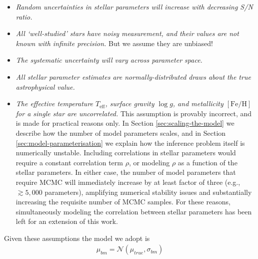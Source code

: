\documentclass[preprint]{aastex}
\newcommand{\teff}{T_{\mathrm{eff}}}
\newcommand{\logg}{\log g}
\newcommand{\feh}{[\mathrm{Fe/H}]}
\newcommand{\normal}[2]{\mathcal{N}\left(#1, #2\right)}
\begin{document}
\begin{itemize}
    \item   \emph{Random uncertainties in stellar parameters will increase with
            decreasing S/N ratio.}

    \item   \emph{All `well-studied' stars have noisy measurement, and their values
            are not known with infinite precision.} But we assume they are unbiased!

    \item   \emph{The systematic uncertainty will vary across parameter space.}

    \item   \emph{All stellar parameter estimates are normally-distributed draws about 
            the true astrophysical value.}

    \item   \emph{The effective temperature $\teff$, surface gravity $\logg$, and
            metallicity $\feh$ for a single star are uncorrelated.}
            This assumption is provably incorrect, and is made for practical reasons
            only. In Section \ref{sec:scaling-the-model} we describe how the number
            of model parameters scales, and in Section \ref{sec:model-parameterisation}
            we explain how the inference problem itself is numerically unstable.
            Including correlations in stellar parameters would require a constant
            correlation term $\rho$, or modeling $\rho$ as a function of the stellar
            parameters. In either case, the number of model parameters that require
            MCMC will immediately increase by at least factor of three (e.g.,
            $\gtrsim5{,}000$ parameters), amplifying numerical stability issues and
            substantially increasing the requisite number of MCMC samples. For these
            reasons, simultaneously modeling the correlation between stellar
            parameters has been left for an extension of this work.
 
\end{itemize}

Given these assumptions the model we adopt is
\begin{eqnarray}
    \mu_{bm} = \normal{\mu_{true}}{\sigma_{bm}} 
\end{eqnarray} 


\end{document}

